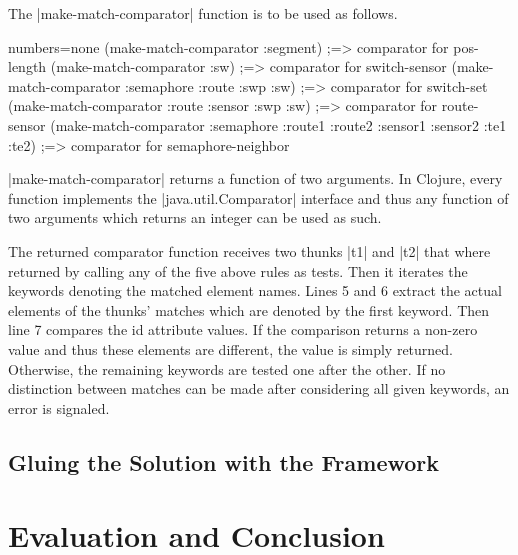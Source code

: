 \documentclass[submission]{eptcs}
\newcommand{\code}{\clojureinline}
\begin{document}
The \code|make-match-comparator| function is to be used as follows.

\begin{clojurecode*}{numbers=none}
(make-match-comparator :segment)
;=> comparator for pos-length
(make-match-comparator :sw)
;=> comparator for switch-sensor
(make-match-comparator :semaphore :route :swp :sw)
;=> comparator for switch-set
(make-match-comparator :route :sensor :swp :sw)
;=> comparator for route-sensor
(make-match-comparator :semaphore :route1 :route2 :sensor1 :sensor2 :te1 :te2)
;=> comparator for semaphore-neighbor
\end{clojurecode*}


\code|make-match-comparator| returns a function of two arguments.  In Clojure,
every function implements the \code|java.util.Comparator| interface and thus
any function of two arguments which returns an integer can be used as such.

The returned comparator function receives two thunks \code|t1| and \code|t2|
that where returned by calling any of the five above rules as tests.  Then it
iterates the keywords denoting the matched element names.  Lines 5 and 6
extract the actual elements of the thunks' matches which are denoted by the
first keyword.  Then line 7 compares the \textsf{id} attribute values.  If the
comparison returns a non-zero value and thus these elements are different, the
value is simply returned.  Otherwise, the remaining keywords are tested one
after the other.  If no distinction between matches can be made after
considering all given keywords, an error is signaled.



\subsection{Gluing the Solution with the Framework}
\label{sec:gluing}



\section{Evaluation and Conclusion}
\label{sec:evaluation}



\end{document}
